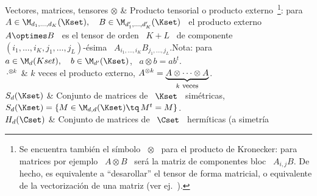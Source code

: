 \begin{notation}{Vectores, matrices, tensores}
\hline
%
%
$\otimes$  &  Producto   tensorial  o  producto  externo~\footnote{Se  encuentra
  tambi\'en  el s\'imbolo  \ $\otimes$  \ para  el producto  de  Kronecker: para
  matrices por ejemplo \ $A \otimes B$  \ ser\'a la matriz de componentes bloc \
  $A_{i,j}  B$. De hecho,  es equivalente  a ``desarollar''  el tensor  de forma
  matricial,   o  equivalente  de   la  vectorizaci\'on   de  una   matriz  (ver
  ej.~\cite{MagNeu79}).}:  para $A \in  \M_{d_1,\ldots,d_K}(\Kset), \quad  B \in
\M_{d'_1,\ldots,d'_K}(\Kset)$ \  el producto  externo \ $A  \optimes B$ \  es el
tensor      de      orden      \      $K+L$     \      de      componente      \
$(i_1,\ldots,i_K,j_1,\ldots,j_L)$-\'esima          \         $A_{i_1,\ldots,i_K}
B_{j_1,\ldots,j_L} $.\vspace{1mm}\newline Nota: para \ $a \in \M_d(Kset), \quad
b \in \M_{d'}(\Kset)$, \ $a \otimes b = a b^t$.\\[2.5mm]
\hline
%
$\cdot^{\otimes k}$ & $k$ veces el producto externo, $A^{\otimes k}
= \underbrace{A \otimes \cdots \otimes A}_{k \:\, \mbox{\footnotesize
veces}}$.\\[2.5mm]
\hline
%
$S_d(\Kset)$ & Conjunto de matrices de \ $\Kset$ \ sim\'etricas, \quad $S_d(\Kset) =
\left\{ M \in \M_{d,d}(\Kset) \tq \, M^t = M \right\}$.\\[2.5mm]
\hline
%
$H_d(\Cset)$ & Conjunto de matrices de \ $\Cset$ \ herm\'iticas (a simetr\'ia

\end{notation}
